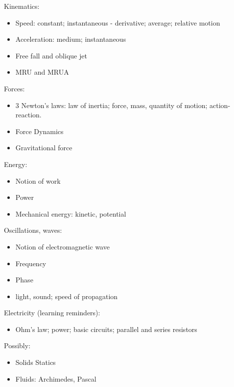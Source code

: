 Kinematics:
\begin{itemize}
    \item Speed: constant; instantaneous - derivative; average; relative motion
    \item Acceleration: medium; instantaneous
    \item Free fall and oblique jet
    \item MRU and MRUA
\end{itemize}
Forces:
\begin{itemize}
    \item 3 Newton's laws: law of inertia; force, mass, quantity of motion; action-reaction.
    \item Force Dynamics
    \item Gravitational force
\end{itemize}
Energy:
\begin{itemize}
    \item Notion of work
    \item Power
    \item Mechanical energy: kinetic, potential
\end{itemize}
Oscillations, waves:
\begin{itemize}
    \item Notion of electromagnetic wave
    \item Frequency
    \item Phase
    \item light, sound; speed of propagation
\end{itemize}
Electricity (learning reminders):
\begin{itemize}
    \item Ohm's law; power; basic circuits; parallel and series resistors
\end{itemize}
Possibly:
\begin{itemize}
    \item Solids Statics
    \item Fluids: Archimedes, Pascal
\end{itemize}